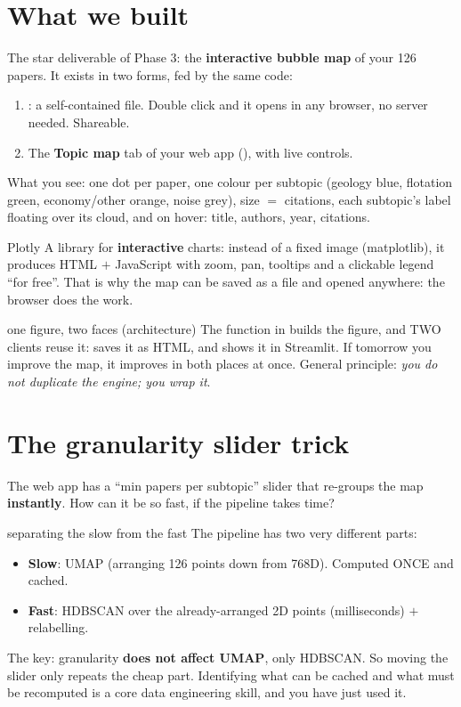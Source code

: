 \documentclass[11pt,a4paper]{article}
\begin{document}
\section{What we built}

The star deliverable of Phase 3: the \textbf{interactive bubble map} of your 126 papers. It
exists in two forms, fed by the same code:
\begin{enumerate}
  \item {}: a self-contained file. Double click and it
        opens in any browser, no server needed. Shareable.
  \item The \textbf{Topic map} tab of your web app (), with live controls.
\end{enumerate}

What you see: one dot per paper, one colour per subtopic (geology blue, flotation green,
economy/other orange, noise grey), size $=$ citations, each subtopic's label floating over its
cloud, and on hover: title, authors, year, citations.

\begin{concepto}{Plotly}
A library for \textbf{interactive} charts: instead of a fixed image (matplotlib), it produces
HTML $+$ JavaScript with zoom, pan, tooltips and a clickable legend ``for free''. That is why
the map can be saved as a file and opened anywhere: the browser does the work.
\end{concepto}

\begin{concepto}{one figure, two faces (architecture)}
The  function in  builds the figure, and
TWO clients reuse it:  saves it as HTML, and  shows it
in Streamlit. If tomorrow you improve the map, it improves in both places at once. General
principle: \emph{you do not duplicate the engine; you wrap it}.
\end{concepto}

\section{The granularity slider trick}

The web app has a ``min papers per subtopic'' slider that re-groups the map \textbf{instantly}.
How can it be so fast, if the pipeline takes time?

\begin{concepto}{separating the slow from the fast}
The pipeline has two very different parts:
\begin{itemize}
  \item \textbf{Slow}: UMAP (arranging 126 points down from 768D). Computed ONCE and cached.
  \item \textbf{Fast}: HDBSCAN over the already-arranged 2D points (milliseconds) $+$ relabelling.
\end{itemize}
The key: granularity \textbf{does not affect UMAP}, only HDBSCAN. So moving the slider only
repeats the cheap part. Identifying what can be cached and what must be recomputed is a core
data engineering skill, and you have just used it.
\end{concepto}
\end{document}
